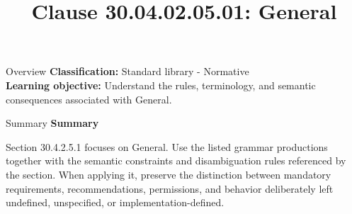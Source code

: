 \documentclass[10pt,letterpaper]{article}
\title{Clause 30.04.02.05.01: General}
\author{}
\date{}
\begin{document}
\maketitle
\begin{CornellOverviewBox}{Overview}
\textbf{Classification:} Standard library - Normative\\[2pt]
\textbf{Learning objective:} Understand the rules, terminology, and semantic consequences associated with General.
\end{CornellOverviewBox}\begin{CornellSummaryBox}{Summary}
{\sffamily\bfseries\color{Accent} Summary}\par\vspace{3pt}Section 30.4.2.5.1 focuses on General. Use the listed grammar productions together with the semantic constraints and disambiguation rules referenced by the section. When applying it, preserve the distinction between mandatory requirements, recommendations, permissions, and behavior deliberately left undefined, unspecified, or implementation-defined.
\end{CornellSummaryBox}
\end{document}
